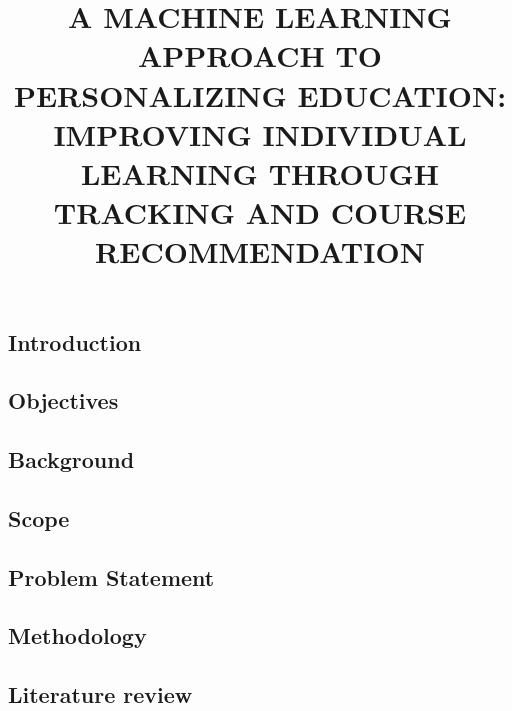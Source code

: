 \documentclass{article}
\begin{document}
\title{A MACHINE LEARNING APPROACH TO PERSONALIZING EDUCATION: IMPROVING INDIVIDUAL LEARNING THROUGH TRACKING AND COURSE RECOMMENDATION}
\maketitle

\subsection{Introduction}

\subsection{Objectives}

\subsection{Background}

\subsection{Scope}

\subsection{Problem Statement}

\subsection{Methodology}

\subsection{Literature review}
\end{document}
